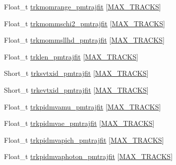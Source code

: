 \begin{DoxyCompactItemize}
\item 
Float\-\_\-t \hyperlink{classanatree_a2aeeeb27bbd68acf0a4c3d3f4b2ab82c}{trkmomrange\-\_\-pmtrajfit} \mbox{[}\hyperlink{anatree__core__v09410002__orig_8h_a327fd4e796e4a0d78947524c96e4362e}{M\-A\-X\-\_\-\-T\-R\-A\-C\-K\-S}\mbox{]}
\item 
Float\-\_\-t \hyperlink{classanatree_af4bf7af4809c404814a1d84175d95339}{trkmommschi2\-\_\-pmtrajfit} \mbox{[}\hyperlink{anatree__core__v09410002__orig_8h_a327fd4e796e4a0d78947524c96e4362e}{M\-A\-X\-\_\-\-T\-R\-A\-C\-K\-S}\mbox{]}
\item 
Float\-\_\-t \hyperlink{classanatree_ac0d1d2fc3fe6e48e81257c327f8f94bc}{trkmommsllhd\-\_\-pmtrajfit} \mbox{[}\hyperlink{anatree__core__v09410002__orig_8h_a327fd4e796e4a0d78947524c96e4362e}{M\-A\-X\-\_\-\-T\-R\-A\-C\-K\-S}\mbox{]}
\item 
Float\-\_\-t \hyperlink{classanatree_ac99185ab75915de0b9003619a3fd7864}{trklen\-\_\-pmtrajfit} \mbox{[}\hyperlink{anatree__core__v09410002__orig_8h_a327fd4e796e4a0d78947524c96e4362e}{M\-A\-X\-\_\-\-T\-R\-A\-C\-K\-S}\mbox{]}
\item 
Short\-\_\-t \hyperlink{classanatree_aeab61a1f293160bd323af37b3effe604}{trksvtxid\-\_\-pmtrajfit} \mbox{[}\hyperlink{anatree__core__v09410002__orig_8h_a327fd4e796e4a0d78947524c96e4362e}{M\-A\-X\-\_\-\-T\-R\-A\-C\-K\-S}\mbox{]}
\item 
Short\-\_\-t \hyperlink{classanatree_a8812d0537b469650baebff4fbd339d46}{trkevtxid\-\_\-pmtrajfit} \mbox{[}\hyperlink{anatree__core__v09410002__orig_8h_a327fd4e796e4a0d78947524c96e4362e}{M\-A\-X\-\_\-\-T\-R\-A\-C\-K\-S}\mbox{]}
\item 
Float\-\_\-t \hyperlink{classanatree_abdc0b461dd4ae741e79dc44b43613f8b}{trkpidmvamu\-\_\-pmtrajfit} \mbox{[}\hyperlink{anatree__core__v09410002__orig_8h_a327fd4e796e4a0d78947524c96e4362e}{M\-A\-X\-\_\-\-T\-R\-A\-C\-K\-S}\mbox{]}
\item 
Float\-\_\-t \hyperlink{classanatree_aa63656e8d9ace690034a03fb6bb67c8a}{trkpidmvae\-\_\-pmtrajfit} \mbox{[}\hyperlink{anatree__core__v09410002__orig_8h_a327fd4e796e4a0d78947524c96e4362e}{M\-A\-X\-\_\-\-T\-R\-A\-C\-K\-S}\mbox{]}
\item 
Float\-\_\-t \hyperlink{classanatree_a312cdb3d468947bcf063fb4a03b127d5}{trkpidmvapich\-\_\-pmtrajfit} \mbox{[}\hyperlink{anatree__core__v09410002__orig_8h_a327fd4e796e4a0d78947524c96e4362e}{M\-A\-X\-\_\-\-T\-R\-A\-C\-K\-S}\mbox{]}
\item 
Float\-\_\-t \hyperlink{classanatree_ac5425c12babfab45fa71d1ea8b65d0d8}{trkpidmvaphoton\-\_\-pmtrajfit} \mbox{[}\hyperlink{anatree__core__v09410002__orig_8h_a327fd4e796e4a0d78947524c96e4362e}{M\-A\-X\-\_\-\-T\-R\-A\-C\-K\-S}\mbox{]}

\end{DoxyCompactItemize}
